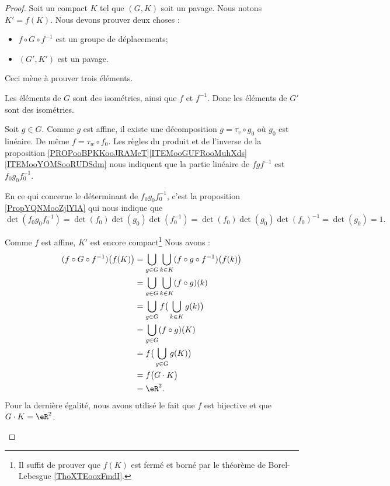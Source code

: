 \begin{proof}
	Soit un compact \( K\) tel que \( (G,K)\) soit un pavage. Nous notons \( K'=f(K)\). Nous devons prouver deux choses :
	\begin{itemize}
		\item \( f\circ G\circ f^{-1}\) est un groupe de déplacements;
		\item \( (G',K')\) est un pavage.
	\end{itemize}

	Ceci mène à prouver trois éléments.
	\begin{subproof}
		Les éléments de \( G\) sont des isométries, ainsi que \( f\) et \( f^{-1}\). Donc les éléments de \( G'\) sont des isométries.

		Soit \( g\in G\). Comme \( g\) est affine, il existe une décomposition \( g=\tau_v\circ g_0\) où \( g_0\) est linéaire. De même \( f=\tau_w\circ f_0\). Les règles du produit et de l'inverse de la proposition \ref{PROPooBPKKooJRAMeT}\ref{ITEMooGUFRooMuhXds}\ref{ITEMooYOMSooRUDSdm} nous indiquent que la partie linéaire de \( fgf^{-1}\) est \( f_0g_0f_0^{-1}\).

		En ce qui concerne le déterminant de \( f_0g_0f_0^{-1}\), c'est la proposition \ref{PropYQNMooZjlYlA} qui nous indique que
		\begin{equation}
			\det(f_0g_0f_0^{-1})=\det(f_0)\det(g_0)\det(f_0^{-1})=\det(f_0)\det(g_0)\det(f_0)^{-1}=\det(g_0)=1.
		\end{equation}

		\spitem[\( G'\cdot K'=\eR^2\)]
		Comme \( f\) est affine, \( K'\) est encore compact\footnote{Il suffit de prouver que \( f(K)\) est fermé et borné par le théorème de Borel-Lebesgue \ref{ThoXTEooxFmdI}.} Nous avons :
		\begin{subequations}
			\begin{align}
				(f\circ G\circ f^{-1})\big( f(K) \big) & =\bigcup_{g\in G}\bigcup_{k\in K}(f\circ g\circ f^{-1})\big( f(k) \big) \\
				                                       & =\bigcup_{g\in G}\bigcup_{k\in K}(f\circ g)(k)                          \\
				                                       & =\bigcup_{g\in G}f\big( \bigcup_{k\in K}g(k) \big)                      \\
				                                       & =\bigcup_{g\in G}(f\circ g)(K)                                          \\
				                                       & =f\big( \bigcup_{g\in G}g(K) \big)                                      \\
				                                       & =f\big( G\cdot K \big)                                                  \\
				                                       & =\eR^2.
			\end{align}
		\end{subequations}
		Pour la dernière égalité, nous avons utilisé le fait que \( f\) est bijective et que \( G\cdot K=\eR^2\).


\end{subproof}
\end{proof}
